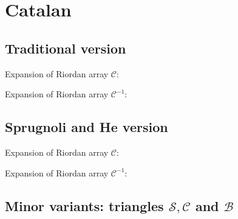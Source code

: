 \documentclass[10pt,a4paper]{article} %
\begin{document}
    \section{Catalan}

    \subsection{Traditional version}

    Expansion of Riordan array $\mathcal{C}$:
    
    Expansion of Riordan array $\mathcal{C}^{-1}$:
    

    
    

    \subsection{Sprugnoli and He version}

    Expansion of Riordan array $\mathcal{C}$:
    
    Expansion of Riordan array $\mathcal{C}^{-1}$:
    

    
    
    
    

    \subsection{Minor variants: triangles $\mathcal{S}, \mathcal{C}$ and $\mathcal{B}$}
\end{document}
